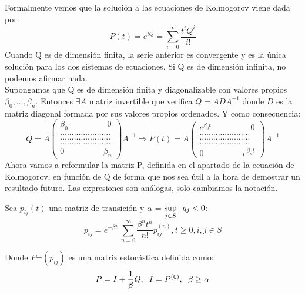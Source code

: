 \documentclass[12pt,a4paper]{article}
\begin{document}
	Formalmente vemos que la solución a las ecuaciones de Kolmogorov viene dada por:
	\begin{equation*}
		P(t) = e^{t Q} = \sum_{i = 0}^{\infty}\frac{t^{i} Q^{i}}{i!}
	\end{equation*} 
	Cuando Q es de dimensión finita, la serie anterior es convergente y es la única solución para los dos sistemas de ecuaciones. Si Q es de dimensión infinita, no podemos afirmar nada.
	\\[0.2cm]
	Supongamos que Q es de dimensión finita y diagonalizable con valores propios $\beta_0 ,..., \beta_n$. Entonces $\exists A$ matriz invertible que verifica $Q = ADA^{-1}$ donde $D$ es la matriz diagonal formada por sus valores propios ordenados. Y como consecuencia:
	\begin{equation*}
		Q = A \begin{pmatrix}
			\beta_0 \hspace{2cm} 0 \\
			......................\\
			......................\\
			......................\\
			0 \hspace{2cm} \beta_n
		\end{pmatrix} A^{-1}
	\Rightarrow
		P(t) = A \begin{pmatrix}
			e^{\beta_0 t} \hspace{2cm} 0 \\
			......................\\
			......................\\
			......................\\
			0 \hspace{2cm} e^{\beta_n t}
		\end{pmatrix} A^{-1}
	\end{equation*}
	Ahora vamos a reformular la matriz P, definida en el apartado de la ecuación de Kolmogorov, en función de Q de forma que nos sea útil a la hora de demostrar un resultado futuro. Las expresiones son análogas, solo cambiamos la notación.
   \begin{theorem}
   	
   		Sea $p_{ij}(t)$	una matriz de transición y $\alpha$ = $\sup\limits_{j\in S} \hspace{0.2cm} q_j <0$:
   		\begin{equation*}
   		p_{ij}=e^{-\beta t}\ \sum_{n = 0}^{\infty}\frac{\beta^{n} t^{n}}{n!}p_{ij}^{(n)}, t \geq 0, i,j \in S
   		\end{equation*}
   		
   		Donde $P$=$(p_{ij})$ es una matriz estocástica definida como:
   		\begin{equation*}
   		P=I+\frac{1}{\beta}Q, \hspace{0.2cm} I= P^{(0)}, \hspace{0.2cm} \beta \geq \alpha
   		\end{equation*}
   		
   \end{theorem}
         
\end{document}
